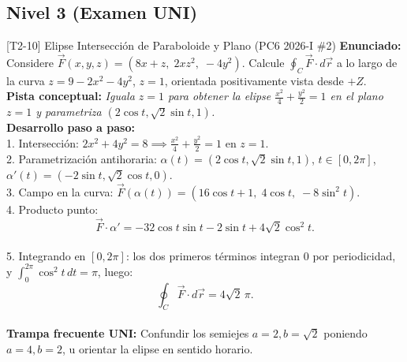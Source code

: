 \documentclass[11pt,a4paper]{article}
\begin{document}
\subsection{Nivel 3 (Examen UNI)}

\begin{ejerciciobox}{[T2-10] Elipse Intersección de Paraboloide y Plano (PC6 2026-I \#2)}
\textbf{Enunciado:} Considere $\vec{F}(x,y,z) = (8x+z,\; 2xz^2,\; -4y^2)$. Calcule $\oint_C \vec{F}\cdot d\vec{r}$ a lo largo de la curva $z = 9 - 2x^2 - 4y^2$, $z = 1$, orientada positivamente vista desde $+Z$.\\[0.2cm]
\textbf{Pista conceptual:} \emph{Iguala $z=1$ para obtener la elipse $\frac{x^2}{4} + \frac{y^2}{2} = 1$ en el plano $z=1$ y parametriza $(2\cos t, \sqrt{2}\sin t, 1)$.}\\[0.2cm]
\textbf{Desarrollo paso a paso:}\\
1. Intersección: $2x^2 + 4y^2 = 8 \implies \frac{x^2}{4} + \frac{y^2}{2} = 1$ en $z=1$.\\
2. Parametrización antihoraria: $\alpha(t) = (2\cos t, \sqrt{2}\sin t, 1)$, $t \in [0, 2\pi]$, $\alpha'(t) = (-2\sin t, \sqrt{2}\cos t, 0)$.\\
3. Campo en la curva: $\vec{F}(\alpha(t)) = (16\cos t + 1,\; 4\cos t,\; -8\sin^2 t)$.\\
4. Producto punto:\\
$$\vec{F}\cdot\alpha' = -32\cos t\sin t - 2\sin t + 4\sqrt{2}\cos^2 t.$$\\
5. Integrando en $[0, 2\pi]$: los dos primeros términos integran $0$ por periodicidad, y $\int_0^{2\pi} \cos^2 t\,dt = \pi$, luego:\\
$$\oint_C \vec{F}\cdot d\vec{r} = 4\sqrt{2}\,\pi.$$\\[0.2cm]
\textbf{Trampa frecuente UNI:} Confundir los semiejes $a=2, b=\sqrt{2}$ poniendo $a=4, b=2$, u orientar la elipse en sentido horario.
\end{ejerciciobox}
\end{document}
